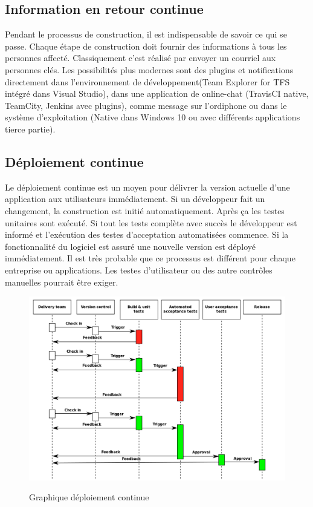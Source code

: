 \subsection{Information en retour continue}

Pendant le processus de construction, il est indispensable de savoir ce qui se passe. Chaque étape de construction doit fournir des informations à tous les personnes affecté. Classiquement c'est réalisé par envoyer un courriel aux personnes clés. Les possibilités plus modernes sont des plugins et notifications directement dans l'environnement de développement(Team Explorer for TFS intégré dans Visual Studio), dans une application de online-chat (TravisCI native, TeamCity, Jenkins avec plugins), comme message sur l'ordiphone ou dans le système d'exploitation (Native dans Windows 10 ou avec différents applications tierce partie).

\newpage
\subsection{Déploiement continue}

Le déploiement continue est un moyen pour délivrer la version actuelle d'une application aux utilisateurs immédiatement. Si un développeur fait un changement, la construction est initié automatiquement. Après ça les testes unitaires sont exécuté. Si tout les tests complète avec succès  le développeur est informé et l'exécution des testes d'acceptation automatisées commence. Si la fonctionnalité du logiciel est assuré une nouvelle version est déployé immédiatement.
Il est très probable que ce processus est différent pour chaque entreprise ou applications. Les testes d'utilisateur ou des autre contrôles manuelles pourrait être exiger.\\
\begin{figure}[H]
\centering
\includegraphics[width=15cm]{bilder/Continuous_Delivery}
\caption{Graphique déploiement continue}\cite{wikicd}
\label{fig:continousdelivery}
\end{figure}

